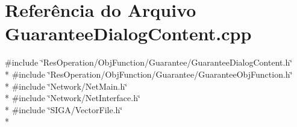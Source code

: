 \section{Referência do Arquivo Guarantee\+Dialog\+Content.\+cpp}
\label{_obj_function_2_guarantee_2_guarantee_dialog_content_8cpp}
{\ttfamily \#include \char`\"{}Res\+Operation/\+Obj\+Function/\+Guarantee/\+Guarantee\+Dialog\+Content.\+h\char`\"{}}\\*
{\ttfamily \#include \char`\"{}Res\+Operation/\+Obj\+Function/\+Guarantee/\+Guarantee\+Obj\+Function.\+h\char`\"{}}\\*
{\ttfamily \#include \char`\"{}Network/\+Net\+Main.\+h\char`\"{}}\\*
{\ttfamily \#include \char`\"{}Network/\+Net\+Interface.\+h\char`\"{}}\\*
{\ttfamily \#include \char`\"{}S\+I\+G\+A/\+Vector\+File.\+h\char`\"{}}\\*
